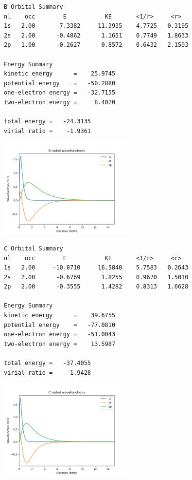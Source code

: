 \documentclass[11pt]{article}
\begin{document}
\label{}
\begin{verbatim}
B Orbital Summary
nl    occ        E           KE       <1/r>     <r>
1s   2.00      -7.3382     11.3935    4.7725   0.3195
2s   2.00      -0.4862      1.1651    0.7749   1.8633
2p   1.00      -0.2627      0.8572    0.6432   2.1503

Energy Summary
kinetic energy      =    25.9745
potential energy    =   -50.2880
one-electron energy =   -32.7155
two-electron energy =     8.4020

total energy =   -24.3135
virial ratio =    -1.9361
\end{verbatim}


\begin{center}
\includegraphics[width=0.5\textwidth]{./Images/B-wave-functions.png}
\end{center}



\label{}
\begin{verbatim}
C Orbital Summary
nl    occ        E           KE       <1/r>     <r>
1s   2.00     -10.8710     16.5840    5.7583   0.2643
2s   2.00      -0.6769      1.8255    0.9670   1.5010
2p   2.00      -0.3555      1.4282    0.8313   1.6628

Energy Summary
kinetic energy      =    39.6755
potential energy    =   -77.0810
one-electron energy =   -51.0043
two-electron energy =    13.5987

total energy =   -37.4055
virial ratio =    -1.9428
\end{verbatim}


\begin{center}
\includegraphics[width=0.5\textwidth]{./Images/C-wave-functions.png}
\end{center}
\end{document}
